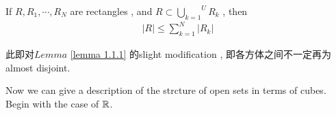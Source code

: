\newpage

	\begin{lemma}\label{lemma 1.1.2}
		If $R , R_1 , \cdots , R_N$ are rectangles , and $R \subset \overset{U}{\underset{k = 1}{\bigcup}}{R_k}$ , then
		\begin{align}
			\left| R \right| \leq \sum_{k = 1}^{N}{\left| R_k \right|}
		\end{align}
		
		\begin{rmk}
			 此即对$Lemma$ \ref{lemma 1.1.1} 的slight modification , 即各方体之间不一定再为almost disjoint.
		\end{rmk}
	\end{lemma}

	\vspace*{3em}
	Now we can give a description of the strcture of open sets in terms of cubes. Begin with the case of $\mathbb{R}$.
	
